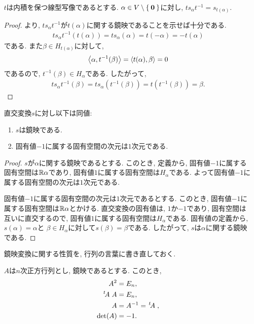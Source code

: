 \begin{prop}
  $t$は内積を保つ線型写像であるとする.
  $\alpha\in V\setminus\Set{\boldsymbol{0}}$に対し,
  $ts_\alpha t^{-1}=s_{t(\alpha)}$.
\end{prop}
\begin{proof}
より,
  $ts_\alpha t^{-1}$が$t(\alpha)$に関する鏡映であることを示せば十分である.
\begin{align*}
  ts_\alpha t^{-1}(t(\alpha))=ts_\alpha(\alpha)=t(-\alpha)=-t(\alpha)
\end{align*}
である. また$\beta\in H_{t(\alpha)}$に対して,
\begin{align*}
\Braket{\alpha,t^{-1}(\beta)}
=\Braket{t(\alpha),\beta}
=0
\end{align*}
であるので, $t^{-1}(\beta)\in H_\alpha$である.
したがって,
\begin{align*}
  ts_\alpha t^{-1}(\beta)=ts_\alpha(t^{-1}(\beta))=t(t^{-1}(\beta))=\beta.
\end{align*}
\end{proof}

\begin{prop}
  直交変換$s$に対し以下は同値:
  \begin{enumerate}
  \item $s$は鏡映である.
  \item 固有値$-1$に属する固有空間の次元は$1$次元である.
  \end{enumerate}
\end{prop}
\begin{proof}
  $s$が$\alpha$に関する鏡映であるとする.
  このとき, 定義から,
  固有値$-1$に属する固有空間は$\mathbb{R}\alpha$であり,
  固有値$1$に属する固有空間は$H_\alpha$である.
  よって固有値$-1$に属する固有空間の次元は$1$次元である.

  固有値$-1$に属する固有空間の次元は$1$次元であるとする.
  このとき, 固有値$-1$に属する固有空間は$\mathbb{R}\alpha$とかける.
  直交変換の固有値は, $1$か$-1$であり, 固有空間は互いに直交するので,
  固有値$1$に属する固有空間は$H_\alpha$である.
  固有値の定義から,
  $s(\alpha)=\alpha$と
  $\beta\in H_\alpha$に対して$s(\beta)=\beta$である.
  したがって,
  $s$は$\alpha$に関する鏡映である.
\end{proof}

鏡映変換に関する性質を, 行列の言葉に書き直しておく.
\begin{cor}
  $A$は$n$次正方行列とし, 鏡映であるとする.
  このとき,
  \begin{align*}
    A^2&=E_n,\\
    \left.^{t}\!A\right.A&=E_n,\\
    A&=A^{-1}=\left.^{t}\!A\right.,\\
    \det(A)&=-1.
  \end{align*}
\end{cor}


